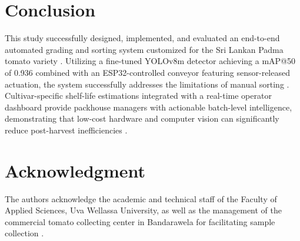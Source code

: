 \documentclass[conference,pageno]{IEEEtran}
\begin{document}
\section{Conclusion}
This study successfully designed, implemented, and evaluated an end-to-end automated grading and sorting system customized for the Sri Lankan Padma tomato variety \cite{abekoon2024}. Utilizing a fine-tuned YOLOv8m detector achieving a mAP@50 of 0.936 combined with an ESP32-controlled conveyor featuring sensor-released actuation, the system successfully addresses the limitations of manual sorting \cite{moya2025, terven2023}. Cultivar-specific shelf-life estimations integrated with a real-time operator dashboard provide packhouse managers with actionable batch-level intelligence, demonstrating that low-cost hardware and computer vision can significantly reduce post-harvest inefficiencies \cite{geetha2025, tarlak2023}.

\section*{Acknowledgment}
The authors acknowledge the academic and technical staff of the Faculty of Applied Sciences, Uva Wellassa University, as well as the management of the commercial tomato collecting center in Bandarawela for facilitating sample collection \cite{abekoon2024}.
\end{document}
